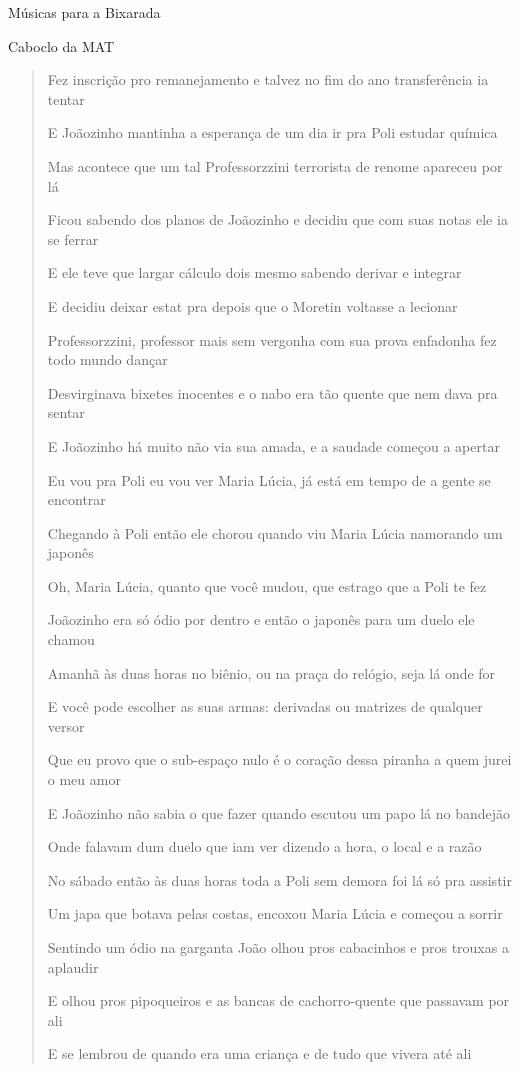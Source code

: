 \begin{secao}{Músicas para a Bixarada}
\begin{subsecao}{Caboclo da MAT}
\begin{verse}
Fez inscrição pro remanejamento e talvez no fim do ano transferência ia tentar

E Joãozinho mantinha a esperança de um dia ir pra Poli estudar química

Mas acontece que um tal Professorzzini terrorista de renome apareceu por lá

Ficou sabendo dos planos de Joãozinho e decidiu que com suas notas ele ia se
ferrar

E ele teve que largar cálculo dois mesmo sabendo derivar e integrar

E decidiu deixar estat pra depois que o Moretin voltasse a lecionar

Professorzzini, professor mais sem vergonha com sua prova enfadonha fez todo
mundo dançar

Desvirginava bixetes inocentes e o nabo era tão quente que nem dava pra sentar

E Joãozinho há muito não via sua amada, e a saudade começou a apertar

Eu vou pra Poli eu vou ver Maria Lúcia, já está em tempo de a gente se encontrar

Chegando à Poli então ele chorou quando viu Maria Lúcia namorando um japonês

Oh, Maria Lúcia, quanto que você mudou, que estrago que a Poli te fez

Joãozinho era só ódio por dentro e então o japonês para um duelo ele chamou

Amanhã às duas horas no biênio, ou na praça do relógio, seja lá onde for

E você pode escolher as suas armas: derivadas ou matrizes de qualquer versor

Que eu provo que o sub-espaço nulo é o coração dessa piranha a quem jurei o meu
amor

E Joãozinho não sabia o que fazer quando escutou um papo lá no bandejão

Onde falavam dum duelo que iam ver dizendo a hora, o local e a razão

No sábado então às duas horas toda a Poli sem demora foi lá só pra assistir

Um japa que botava pelas costas, encoxou Maria Lúcia e começou a sorrir

Sentindo um ódio na garganta João olhou pros cabacinhos e pros trouxas a
aplaudir

E olhou pros pipoqueiros e as bancas de cachorro-quente que passavam por ali

E se lembrou de quando era uma criança e de tudo que vivera até ali


\end{verse}
\end{subsecao}
\end{secao}
